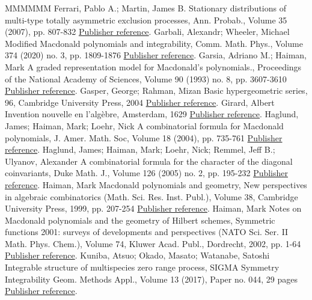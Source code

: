 \begin{thebibliography}{MMMMMM}
 Ferrari, Pablo A.; Martin, James B. Stationary distributions of multi-type totally asymmetric exclusion processes, Ann. Probab., Volume 35 (2007), pp. 807-832 \href{https://alco.centre-mersenne.org/articles/10.5802/alco.248/#FM07}{Publisher reference}.
 Garbali, Alexandr; Wheeler, Michael Modified Macdonald polynomials and integrability, Comm. Math. Phys., Volume 374 (2020) no. 3, pp. 1809-1876 \href{https://alco.centre-mersenne.org/articles/10.5802/alco.248/#garbali-wheeler-2020}{Publisher reference}.
 Garsia, Adriano M.; Haiman, Mark A graded representation model for Macdonald’s polynomials., Proceedings of the National Academy of Sciences, Volume 90 (1993) no. 8, pp. 3607-3610 \href{https://alco.centre-mersenne.org/articles/10.5802/alco.248/#garsia-haiman-1993}{Publisher reference}.
 Gasper, George; Rahman, Mizan Basic hypergeometric series, 96, Cambridge University Press, 2004 \href{https://alco.centre-mersenne.org/articles/10.5802/alco.248/#gasper-rahman-2004}{Publisher reference}.
 Girard, Albert Invention nouvelle en l’algèbre, Amsterdam, 1629 \href{https://alco.centre-mersenne.org/articles/10.5802/alco.248/#girard-1884}{Publisher reference}.
 Haglund, James; Haiman, Mark; Loehr, Nick A combinatorial formula for Macdonald polynomials, J. Amer. Math. Soc, Volume 18 (2004), pp. 735-761 \href{https://alco.centre-mersenne.org/articles/10.5802/alco.248/#HHL05}{Publisher reference}.
 Haglund, James; Haiman, Mark; Loehr, Nick; Remmel, Jeff B.; Ulyanov, Alexander A combinatorial formula for the character of the diagonal coinvariants, Duke Math. J., Volume 126 (2005) no. 2, pp. 195-232 \href{https://alco.centre-mersenne.org/articles/10.5802/alco.248/#LLT2}{Publisher reference}.
 Haiman, Mark Macdonald polynomials and geometry, New perspectives in algebraic combinatorics (Math. Sci. Res. Inst. Publ.), Volume 38, Cambridge University Press, 1999, pp. 207-254 \href{https://alco.centre-mersenne.org/articles/10.5802/alco.248/#Hai99}{Publisher reference}.
 Haiman, Mark Notes on Macdonald polynomials and the geometry of Hilbert schemes, Symmetric functions 2001: surveys of developments and perspectives (NATO Sci. Ser. II Math. Phys. Chem.), Volume 74, Kluwer Acad. Publ., Dordrecht, 2002, pp. 1-64 \href{https://alco.centre-mersenne.org/articles/10.5802/alco.248/#Haiman02}{Publisher reference}.
 Kuniba, Atsuo; Okado, Masato; Watanabe, Satoshi Integrable structure of multispecies zero range process, SIGMA Symmetry Integrability Geom. Methods Appl., Volume 13 (2017), Paper no. 044, 29 pages \href{https://alco.centre-mersenne.org/articles/10.5802/alco.248/#kuniba-okado-watanabe-2017}{Publisher reference}.

\end{thebibliography}

